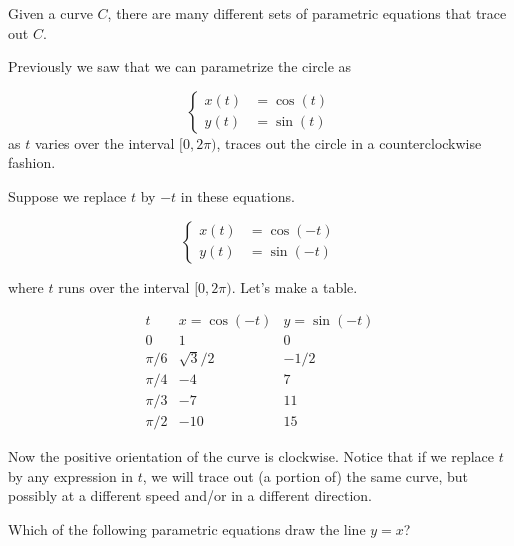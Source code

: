 \documentclass{ximera}
\begin{document}
Given a curve $C$, there are many different sets of parametric equations that trace out $C$.


Previously we saw that we can parametrize the circle as

\[
\begin{cases}
x(t)&=\cos(t) \\
y(t)&=\sin(t)
\end{cases}
\]
as $t$ varies over the interval $[0, 2\pi)$, traces out the circle in a counterclockwise fashion.

Suppose we replace $t$ by $-t$ in these equations.

\[
\begin{cases}
x(t)&=\cos(-t) \\
y(t)&=\sin(-t)
\end{cases}
\]

where $t$ runs over the interval $[0, 2\pi)$. Let's make a table.

\[
\begin{array}{c|c|c}
  t  & x =\cos(-t) & y = \sin(-t)\\\hline
  0  & 1  & 0 \\
  \pi/6  & \sqrt{3}/2 & -1/2 \\
  \pi/4  & -4 & 7 \\
  \pi/3  & -7 & 11\\
  \pi/2  & -10& 15
\end{array}
\]

Now the positive orientation of the curve is clockwise.  Notice that if we replace $t$ by any expression in $t$, we will trace out (a portion of) the same curve, but possibly at a different speed and/or in a different direction.

\begin{question}
  Which of the following parametric equations draw the line $y=x$?
  \begin{selectAll}
  \end{selectAll}
\end{question}
\end{document}
